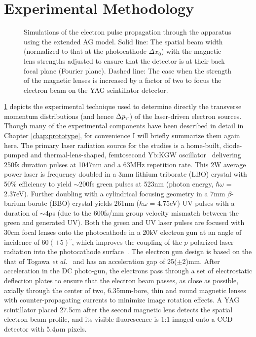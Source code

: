 \section{Experimental Methodology} \label{sec:photocathode-method}

\begin{figure}
  \centering
  
  \caption[Beam profile simulation of experimental setup]{
    Simulations of the electron pulse propagation through the apparatus using the extended AG model.  
    Solid line: The spatial beam width (normalized to that at the photocathode $\Delta x_0$) with the magnetic lens strengths adjusted to ensure that the detector is at their back focal plane (Fourier plane).
    Dashed line: The case when the strength of the magnetic lenses is increased by a factor of two to focus the electron beam on the YAG scintillator detector.
  }
  \label{fig:transverse-measurement}
\end{figure}

\ref{fig:transverse-measurement} depicts the experimental technique used to determine directly the transverse momentum distributions (and hence $\Delta p_{{\scriptscriptstyle T}}$) of the laser-driven electron sources.
Though many of the experimental components have been described in detail in Chapter \ref{chap:prototype}, for convenience I will briefly summarize them again here.
The primary laser radiation source for the studies is a home-built, diode-pumped and thermal-lens-shaped, femtosecond Yb:KGW oscillator~\cite{berger_high-power_2008} delivering 250fs duration pulses at 1047nm and a 63MHz repetition rate.
This 2W average power laser is frequency doubled in a 3mm lithium triborate (LBO) crystal with 50\% efficiency to yield $\sim$200fs green pulses at 523nm (photon energy, $\hbar \omega$ = 2.37eV).
Further doubling with a cylindrical focusing geometry in a 7mm $\beta$-barium borate (BBO) crystal yields 261nm ($\hbar \omega$ = 4.75eV) UV pulses with a duration of $\sim$4ps (due to the 600fs/mm group velocity mismatch between the green and generated UV).
Both the green and UV laser pulses are focused with 30cm focal lenses onto the photocathode in a 20kV electron gun at an angle of incidence of $60(\pm5)^{\circ}$, which improves the coupling of the $p$-polarized laser radiation into the photocathode surface~\cite{berger_dc_2009}.
The electron gun design is based on the that of Togawa \textit{et al.}~\cite{berger_dc_2009,togawa_ceb6_2007} and has an acceleration gap of 25($\pm$2)mm.
After acceleration in the DC photo-gun, the electrons pass through a set of electrostatic deflection plates to ensure that the electron beam passes, as close as possible, axially through the center of two, 6.35mm-bore, thin and round magnetic lenses with counter-propagating currents to minimize image rotation effects.
A YAG scintillator placed 27.5cm after the second magnetic lens detects the spatial electron beam profile, and its visible fluorescence is 1:1 imaged onto a CCD detector with 5.4$\mu$m pixels. 

